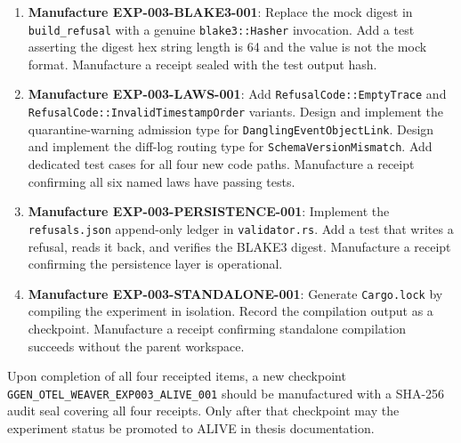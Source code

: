 \begin{enumerate}
  \item \textbf{Manufacture EXP-003-BLAKE3-001}: Replace the mock digest in
        \texttt{build\_refusal} with a genuine \texttt{blake3::Hasher} invocation.
        Add a test asserting the digest hex string length is 64 and the value is
        not the mock format. Manufacture a receipt sealed with the test output hash.
  \item \textbf{Manufacture EXP-003-LAWS-001}: Add \texttt{RefusalCode::EmptyTrace}
        and \texttt{RefusalCode::InvalidTimestampOrder} variants. Design and implement
        the quarantine-warning admission type for \texttt{DanglingEventObjectLink}.
        Design and implement the diff-log routing type for \texttt{SchemaVersionMismatch}.
        Add dedicated test cases for all four new code paths. Manufacture a receipt
        confirming all six named laws have passing tests.
  \item \textbf{Manufacture EXP-003-PERSISTENCE-001}: Implement the
        \texttt{refusals.json} append-only ledger in \texttt{validator.rs}. Add a
        test that writes a refusal, reads it back, and verifies the BLAKE3 digest.
        Manufacture a receipt confirming the persistence layer is operational.
  \item \textbf{Manufacture EXP-003-STANDALONE-001}: Generate \texttt{Cargo.lock}
        by compiling the experiment in isolation. Record the compilation output as
        a checkpoint. Manufacture a receipt confirming standalone compilation
        succeeds without the parent workspace.
\end{enumerate}

Upon completion of all four receipted items, a new checkpoint
\texttt{GGEN\_OTEL\_WEAVER\_EXP003\_ALIVE\_001} should be manufactured with a
SHA-256 audit seal covering all four receipts. Only after that checkpoint may the
experiment status be promoted to ALIVE in thesis documentation.
